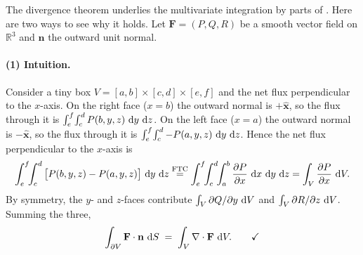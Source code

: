 \begin{nknote}
The divergence theorem underlies the multivariate integration by parts of . Here are two ways to see why it holds. Let $\mathbf{F} = (P, Q, R)$ be a smooth vector field on $\mathbb{R}^3$ and $\mathbf{n}$ the outward unit normal.

\paragraph{(1) Intuition.}
Consider a tiny box $V = [a,b]\times[c,d]\times[e,f]$ and the net flux perpendicular to the $x$-axis. On the right face ($x=b$) the outward normal is $+\hat{\mathbf{x}}$, so the flux through it is $\int_e^f\!\int_c^d P(b,y,z)\,\mathop{}\!\mathrm{d} y\,\mathop{}\!\mathrm{d} z$. On the left face ($x=a$) the outward normal is $-\hat{\mathbf{x}}$, so the flux through it is $\int_e^f\!\int_c^d -P(a,y,z)\,\mathop{}\!\mathrm{d} y\,\mathop{}\!\mathrm{d} z$. Hence the net flux perpendicular to the $x$-axis is
\[
\int_e^f\!\!\int_c^d \big[P(b,y,z) - P(a,y,z)\big]\,\diff y\,\diff z
\overset{\text{FTC}}{=}
\int_e^f\!\!\int_c^d\!\!\int_a^b \frac{\partial P}{\partial x}\,\diff x\,\diff y\,\diff z
= \int_V \frac{\partial P}{\partial x}\,\diff V .
\]
By symmetry, the $y$- and $z$-faces contribute $\int_V \partial Q/\partial y\,\mathop{}\!\mathrm{d} V$ and $\int_V \partial R/\partial z\,\mathop{}\!\mathrm{d} V$. Summing the three,
\[
\int_{\partial V} \mathbf{F}\cdot\mathbf{n}\,\mathop{}\!\mathrm{d} S \;=\; \int_V \nabla\cdot\mathbf{F}\,\mathop{}\!\mathrm{d} V. \qquad\checkmark
\]


\end{nknote}
